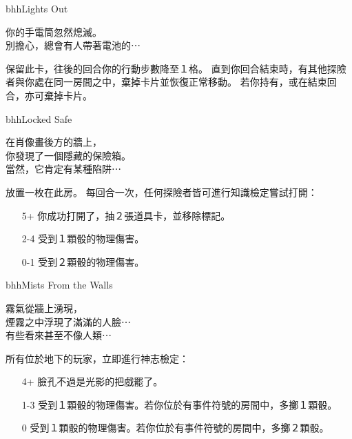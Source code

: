 \begin{EventCard}{bhh}{Lights Out}
  \begin{CardStory}
    你的手電筒忽然熄滅。\\
    別擔心，總會有人帶著電池的⋯
  \end{CardStory}
  保留此卡，往後的回合你的行動步數降至１格。\smallbreak
  直到你回合結束時，有其他探險者與你處在同一房間之中，棄掉卡片並恢復正常移動。\smallbreak
  若你持有，或在結束回合，亦可棄掉卡片。\smallbreak
\end{EventCard}%
\linebreak[0]%
\begin{EventCard}{bhh}{Locked Safe}
  \begin{CardStory}
    在肖像畫後方的牆上，\\
    你發現了一個隱藏的保險箱。\\
    當然，它肯定有某種陷阱⋯
  \end{CardStory}
  放置一枚在此房。\smallbreak
  每回合一次，任何探險者皆可進行知識檢定嘗試打開：
  \begin{itemize}
    \item[5+] 你成功打開了，抽２張道具卡，並移除標記。
    \item[2-4] 受到１顆骰的物理傷害。
    \item[0-1] 受到２顆骰的物理傷害。
  \end{itemize}
\end{EventCard}%
\linebreak[0]%
\begin{EventCard}{bhh}{Mists From the Walls}
  \begin{CardStory}
    霧氣從牆上湧現，\\
    煙霧之中浮現了滿滿的人臉⋯\\
    有些看來甚至不像人類⋯
  \end{CardStory}
  所有位於地下的玩家，立即進行神志檢定：
  \begin{itemize}
    \item[4+] 臉孔不過是光影的把戲罷了。
    \item[1-3] 受到１顆骰的物理傷害。若你位於有事件符號的房間中，多擲１顆骰。
    \item[0] 受到１顆骰的物理傷害。若你位於有事件符號的房間中，多擲２顆骰。
  \end{itemize}
\end{EventCard}%
\linebreak[0]%

